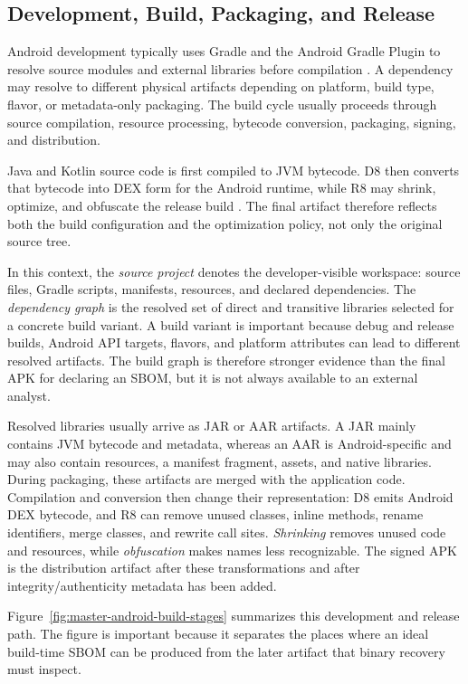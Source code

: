 \subsection{Development, Build, Packaging, and Release}

Android development typically uses Gradle and the Android Gradle Plugin to
resolve source modules and external libraries before compilation
\cite{androidBuildOverview,gradleVariantResolution}. A dependency may resolve
to different physical artifacts depending on platform, build type, flavor, or
metadata-only packaging. The build cycle usually proceeds through source
compilation, resource processing, bytecode conversion, packaging, signing,
and distribution.

Java and Kotlin source code is first compiled to JVM bytecode. D8 then
converts that bytecode into DEX form for the Android runtime, while R8 may
shrink, optimize, and obfuscate the release build \cite{androidD8,androidShrinkCode}. The final
artifact therefore reflects both the build configuration and the optimization
policy, not only the original source tree.

In this context, the \emph{source project} denotes the developer-visible
workspace: source files, Gradle scripts, manifests, resources, and declared
dependencies. The \emph{dependency graph} is the resolved set of direct and
transitive libraries selected for a concrete build variant. A build variant is
important because debug and release builds, Android API targets, flavors, and
platform attributes can lead to different resolved artifacts. The build graph
is therefore stronger evidence than the final APK for declaring an SBOM, but
it is not always available to an external analyst.

Resolved libraries usually arrive as JAR or AAR artifacts. A JAR mainly
contains JVM bytecode and metadata, whereas an AAR is Android-specific and may
also contain resources, a manifest fragment, assets, and native libraries.
During packaging, these artifacts are merged with the application code.
Compilation and conversion then change their representation: D8 emits Android
DEX bytecode, and R8 can remove unused classes, inline methods, rename
identifiers, merge classes, and rewrite call sites. \emph{Shrinking} removes
unused code and resources, while \emph{obfuscation} makes names less
recognizable. The signed APK is the distribution artifact after these
transformations and after integrity/authenticity metadata has been added.

Figure~\ref{fig:master-android-build-stages} summarizes this development and
release path. The figure is important because it separates the places where an
ideal build-time SBOM can be produced from the later artifact that binary
recovery must inspect.

